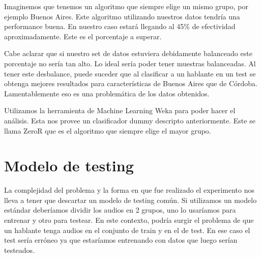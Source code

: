 \documentclass[11pt,a4paper,twoside]{tesis}
\begin{document}
Imaginemos que tenemos un algoritmo que siempre elige un mismo grupo, por ejemplo Buenos Aires. Este algoritmo utilizando nuestros datos tendría una performance buena. En nuestro caso estará llegando al 45\% de efectividad aproximadamente. Este es el porcentaje a superar. 



Cabe aclarar que si nuestro set de datos estuviera debidamente balanceado este porcentaje no sería tan alto. Lo ideal sería poder tener muestras balanceadas. Al tener este desbalance, puede suceder que al clasificar a un hablante en un test se obtenga mejores resultados para características de Buenos Aires que de Córdoba. Lamentablemente eso es una problemática de los datos obtenidos.

Utilizamos la herramienta de Machine Learning Weka para poder hacer el análisis. Esta nos provee un clasificador dummy descripto anteriormente. Este se llama ZeroR que es el algoritmo que siempre elige el mayor grupo.

\section{Modelo de testing}

La complejidad del problema y la forma en que fue realizado el experimento nos lleva a tener que descartar un modelo de testing común. Si utilizamos un modelo estándar deberíamos dividir los audios en 2 grupos, uno lo usaríamos para entrenar y otro para testear. En este contexto, podría surgir el problema de que un hablante tenga audios en el conjunto de train y en el de test. En ese caso el test sería erróneo ya que estaríamos entrenando con datos que luego serían testeados.
\end{document}
